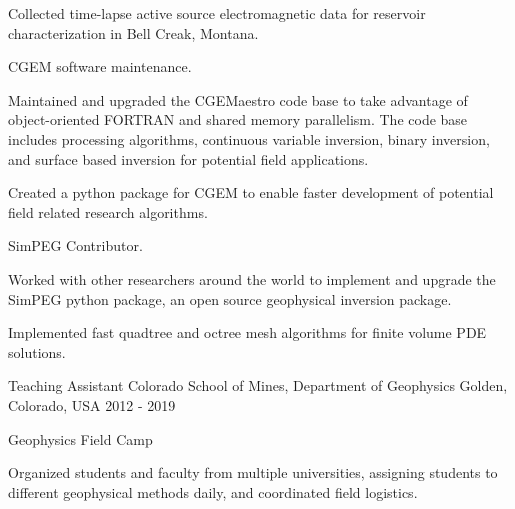 \begin{cventries}
{\begin{cvitems}
        \item {Collected time-lapse active source electromagnetic data for reservoir characterization in Bell Creak, Montana.}
        \vspace{10pt}
      \end{cvitems}
      \begin{cvparagraph}
      \vspace{7pt}
      CGEM software maintenance.
      \vspace{7pt}
      \end{cvparagraph}
      \begin{cvitems}
        \item {Maintained and upgraded the CGEMaestro code base to take advantage of object-oriented FORTRAN and shared memory parallelism. The code base includes processing algorithms, continuous variable inversion, binary inversion, and surface based inversion for potential field applications.}
        \item {Created a python package for CGEM to enable faster development of potential field related research algorithms.}
        \vspace{10pt}
      \end{cvitems}
      \begin{cvparagraph}
      \vspace{7pt}
      SimPEG Contributor.
      \vspace{7pt}
      \end{cvparagraph}
      \begin{cvitems}
        \item {Worked with other researchers around the world to implement and upgrade the SimPEG python package, an open source geophysical inversion package.}
        \item {Implemented fast quadtree and octree mesh algorithms for finite volume PDE solutions.}
      \end{cvitems}
    }
  \cventry
    {Teaching Assistant} %
    {Colorado School of Mines, Department of Geophysics} %
    {Golden, Colorado, USA} %
    {2012 - 2019} %
    {\begin{cvparagraph}
      Geophysics Field Camp
      \vspace{7pt}
      \end{cvparagraph}
      \begin{cvitems} %
        \item {Organized students and faculty from multiple universities, assigning students to different geophysical methods daily, and coordinated field logistics.}

\end{cvitems}}
\end{cventries}

